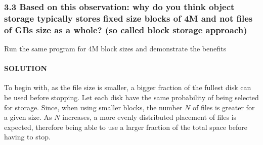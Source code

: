 \documentclass[11pt]{article}
\begin{document}
    \hypertarget{based-on-this-observation-why-do-you-think-object-storage-typically-stores-fixed-size-blocks-of-4m-and-not-files-of-gbs-size-as-a-whole-so-called-block-storage-approach}{%
\subsubsection{3.3 Based on this observation: why do you think object
storage typically stores fixed size blocks of 4M and not files of GBs
size as a whole? (so called block storage
approach)}\label{based-on-this-observation-why-do-you-think-object-storage-typically-stores-fixed-size-blocks-of-4m-and-not-files-of-gbs-size-as-a-whole-so-called-block-storage-approach}}

Run the same program for 4M block sizes and demonstrate the benefits

    \hypertarget{solution}{%
\paragraph{SOLUTION}\label{solution}}

To begin with, as the file size is smaller, a bigger fraction of the
fullest disk can be used before stopping. Let each disk have the same
probability of being selected for storage. Since, when using smaller
blocks, the number \(N\) of files is greater for a given size. As \(N\)
increases, a more evenly distributed placement of files is expected,
therefore being able to use a larger fraction of the total space before
having to stop.
\end{document}
